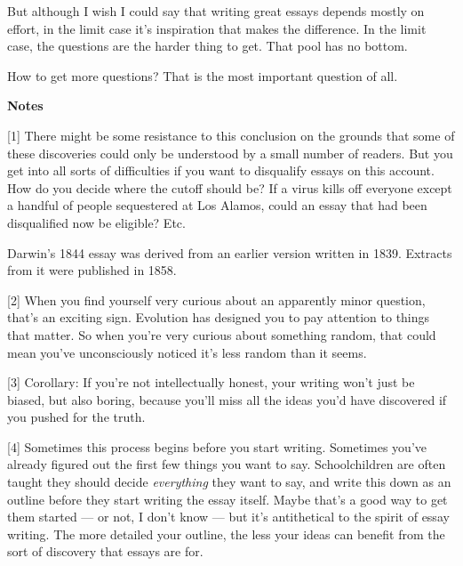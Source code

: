 But
                  although I wish I could say that writing great essays depends
                  mostly on effort, in the limit case it's inspiration that
                  makes the difference. In the limit case, the questions are the
                  harder thing to get. That pool has no bottom.

How
                  to get more questions? That is the most important question of
                  all.











\textbf{Notes}

[1] There might be some resistance to this conclusion on the
                  grounds that some of these discoveries could only be
                  understood by a small number of readers. But you get into all
                  sorts of difficulties if you want to disqualify essays on this
                  account. How do you decide where the cutoff should be? If a
                  virus kills off everyone except a handful of people
                  sequestered at Los Alamos, could an essay that had been
                  disqualified now be eligible? Etc.

Darwin's 1844
                  essay was derived from an earlier version written in 1839.
                  Extracts from it were published in 1858.

[2] When you find yourself very curious about an apparently
                  minor question, that's an exciting sign. Evolution has
                  designed you to pay attention to things that matter. So when
                  you're very curious about something random, that could mean
                  you've unconsciously noticed it's less random than it
                  seems.

[3] Corollary: If you're not intellectually honest, your
                  writing won't just be biased, but also boring, because you'll
                  miss all the ideas you'd have discovered if you pushed for the
                  truth.

[4] Sometimes this process begins before you start writing.
                  Sometimes you've already figured out the first few things you
                  want to say. Schoolchildren are often taught they should
                  decide \emph{everything} they want to say, and write this down
                  as an outline before they start writing the essay itself.
                  Maybe that's a good way to get them started --- or not, I
                  don't know --- but it's antithetical to the spirit of
                  essay writing. The more detailed your outline, the less your
                  ideas can benefit from the sort of discovery that essays are
                  for.

